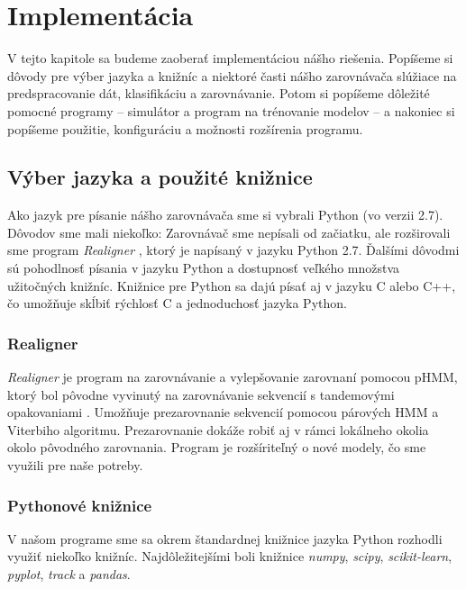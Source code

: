 \chapter{Implementácia}
\label{chap:implementation}

V tejto kapitole sa budeme zaoberať implementáciou nášho riešenia. Popíšeme si dôvody pre výber jazyka a knižníc a niektoré časti nášho zarovnávača slúžiace na predspracovanie dát, klasifikáciu a zarovnávanie. Potom si popíšeme dôležité pomocné programy -- simulátor a program na trénovanie modelov -- a nakoniec si popíšeme použitie, konfiguráciu a možnosti rozšírenia programu.

\section{Výber jazyka a použité knižnice}
Ako jazyk pre písanie nášho zarovnávača sme si vybrali Python (vo verzii 2.7). Dôvodov sme mali niekoľko: Zarovnávač sme nepísali od začiatku, ale rozširovali sme program \textit{Realigner} \cite{nanasi2013probabilistic}, ktorý je napísaný v jazyku Python 2.7. Ďalšími dôvodmi sú pohodlnosť písania v jazyku Python a dostupnosť veľkého množstva užitočných knižníc. Knižnice pre Python sa dajú písať aj v jazyku C alebo C++, čo umožňuje skĺbiť rýchlosť C a jednoduchosť jazyka Python.

\subsection{Realigner}
\label{subsec:realigner}

\textit{Realigner} je program na zarovnávanie a vylepšovanie zarovnaní pomocou pHMM, ktorý bol pôvodne vyvinutý na zarovnávanie sekvencií s tandemovými opakovaniami \cite{nanasi2013probabilistic}. Umožňuje prezarovnanie sekvencií pomocou párových HMM a Viterbiho algoritmu. Prezarovnanie dokáže robiť aj v rámci lokálneho okolia okolo pôvodného zarovnania. Program je rozšíriteľný o nové modely, čo sme využili pre naše potreby.

\subsection{Pythonové knižnice}
V našom programe sme sa okrem štandardnej knižnice jazyka Python rozhodli využiť niekoľko knižníc. Najdôležitejšími boli knižnice \textit{numpy}, \textit{scipy}, \textit{scikit-learn}, \textit{pyplot}, \textit{track} a \textit{pandas}.

